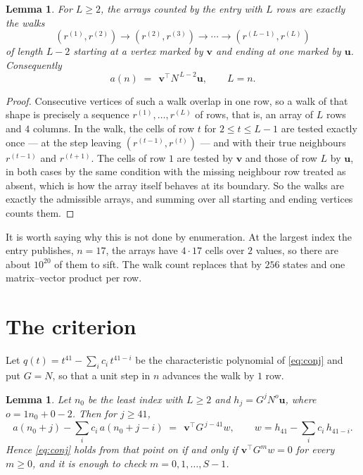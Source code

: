 \documentclass[11pt,a4paper]{article}
\theoremstyle{plain}
\newtheorem{lemma}[theorem]{Lemma}
\theoremstyle{definition}
\begin{document}
\begin{lemma}\label{lem:walk}
For $L\ge2$, the arrays counted by the entry with $L$ rows are exactly the walks
\[
(r^{(1)},r^{(2)})\to(r^{(2)},r^{(3)})\to\cdots\to(r^{(L-1)},r^{(L)})
\]
of length $L-2$ starting at a vertex marked by $\mathbf{v}$ and ending at one marked by
$\mathbf{u}$. Consequently
\[
a(n)\;=\;\,\mathbf{v}^{\!\top}N^{\,L-2}\mathbf{u},\qquad L=n .
\]
\end{lemma}

\begin{proof}
Consecutive vertices of such a walk overlap in one row, so a walk of that shape is
precisely a sequence $r^{(1)},\dots,r^{(L)}$ of rows, that is, an array of $L$ rows
and $4$ columns. In the walk, the cells of row $t$ for $2\le t\le L-1$ are tested
exactly once --- at the step leaving $(r^{(t-1)},r^{(t)})$ --- and with their true
neighbours $r^{(t-1)}$ and $r^{(t+1)}$. The cells of row $1$ are tested by
$\mathbf{v}$ and those of row $L$ by $\mathbf{u}$, in both cases by the same condition
with the missing neighbour row treated as absent, which is how the array itself behaves at
its boundary. So the walks are exactly the admissible arrays, and summing over all starting
and ending vertices counts them.
\end{proof}


It is worth saying why this is not done by enumeration. At the largest index the entry
publishes, $n=17$, the arrays have $4\cdot17$ cells over
$2$ values, so there are about $10^{20}$ of them to sift. The
walk count replaces that by $256$ states and one matrix--vector product per row.
\section{The criterion}

Let $q(t)=t^{41}-\sum_i c_i\,t^{41-i}$ be the characteristic polynomial of
\eqref{eq:conj} and put $G=N$, so that a unit step in $n$ advances the walk by
$1$ row.

\begin{lemma}\label{lem:crit}
Let $n_0$ be the least index with $L\ge2$ and $h_j=G^{j}N^{o}\mathbf{u}$, where
$o=1n_0+0-2$. Then for $j\ge41$,
\[
a(n_0+j)-\sum_i c_i\,a(n_0+j-i)\;=\;\,\mathbf{v}^{\!\top}G^{\,j-41}w,
\qquad w=h_{41}-\sum_i c_i\,h_{41-i} .
\]
Hence \eqref{eq:conj} holds from that point on if and only if
$\mathbf{v}^{\!\top}G^{m}w=0$ for every $m\ge0$, and it is enough to check
$m=0,1,\dots,S-1$.
\end{lemma}
\end{document}
